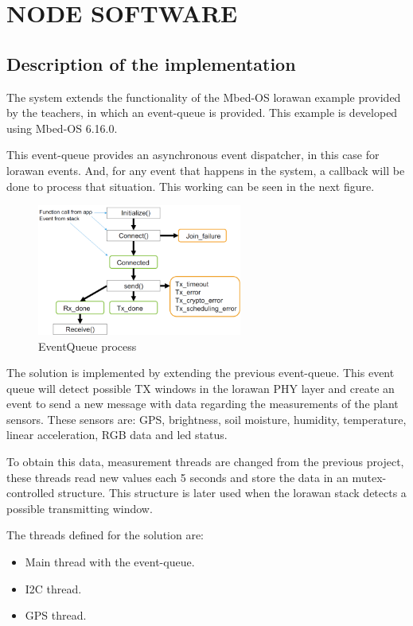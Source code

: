 \section{NODE SOFTWARE}

\subsection{Description of the implementation}

The system extends the functionality of the Mbed-OS \acrshort{lorawan} example provided by the teachers, in which an event-queue is provided. This example is developed using Mbed-OS 6.16.0.

This event-queue provides an asynchronous event dispatcher, in this case for \acrshort{lorawan} events. And, for any event that happens in the system, a callback will be done to process that situation. This working can be seen in the next figure.

\begin{figure}[H]
    \centering
    \includegraphics[width=0.6\textwidth]{images/4/event-queue.png}
    \caption{EventQueue process\cite{SensorNetworksProject1_slides_2024}}
    \label{fig:events}
\end{figure}

The solution is implemented by extending the previous event-queue. This event queue will detect possible TX windows in the \acrshort{lorawan} PHY layer and create an event to send a new message with data regarding the measurements of the plant sensors. These sensors are: 
GPS, brightness, soil moisture, humidity, temperature, linear acceleration, RGB data and led status.

To obtain this data, measurement threads are changed from the previous project, these threads read new values each 5 seconds and store the data in an mutex-controlled structure. This structure is later used when the \acrshort{lorawan} stack detects a possible transmitting window.

The threads defined for the solution are:
\begin{itemize}
    \item Main thread with the event-queue.
    \item I2C thread.
    \item GPS thread.
\end{itemize}

